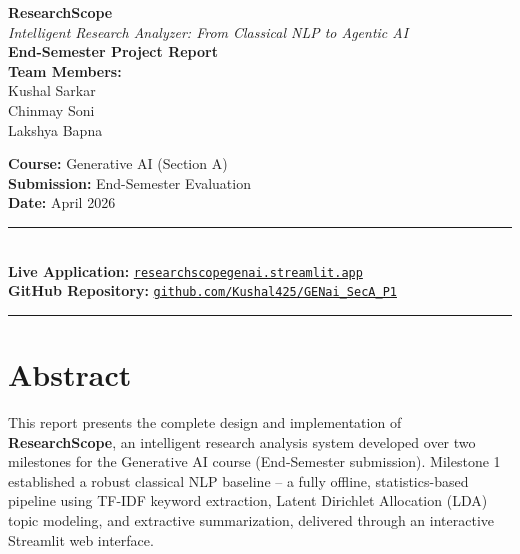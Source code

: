 \documentclass[12pt, a4paper]{article}
\begin{document}
\begin{titlepage}
  \centering
  \vspace*{1.5cm}

  {\LARGE \textbf{ResearchScope}}\\[0.4cm]
  {\Large \textit{Intelligent Research Analyzer: From Classical NLP to Agentic AI}}\\[0.4cm]
  {\large \textbf{End-Semester Project Report}}\\[2cm]

  {\large
    \textbf{Team Members:}\\[0.3cm]
    Kushal Sarkar\\
    Chinmay Soni\\
    Lakshya Bapna\\[1.5cm]
  }

  {\large
    \textbf{Course:} Generative AI (Section A)\\[0.2cm]
    \textbf{Submission:} End-Semester Evaluation\\[0.2cm]
    \textbf{Date:} April 2026\\[2cm]
  }

  \rule{\linewidth}{0.5pt}\\[0.4cm]
  {\large
    \textbf{Live Application:} \href{https://researchscopegenai.streamlit.app/}{\texttt{researchscopegenai.streamlit.app}}\\[0.2cm]
    \textbf{GitHub Repository:} \href{https://github.com/Kushal425/GENai_SecA_P1}{\texttt{github.com/Kushal425/GENai\_SecA\_P1}}
  }\\[0.3cm]
  \rule{\linewidth}{0.5pt}

  \vfill
\end{titlepage}

\tableofcontents
\newpage

\section{Abstract}

This report presents the complete design and implementation of \textbf{ResearchScope}, an intelligent research analysis system developed over two milestones for the Generative AI course (End-Semester submission). Milestone 1 established a robust classical NLP baseline -- a fully offline, statistics-based pipeline using TF-IDF keyword extraction, Latent Dirichlet Allocation (LDA) topic modeling, and extractive summarization, delivered through an interactive Streamlit web interface.
\end{document}
